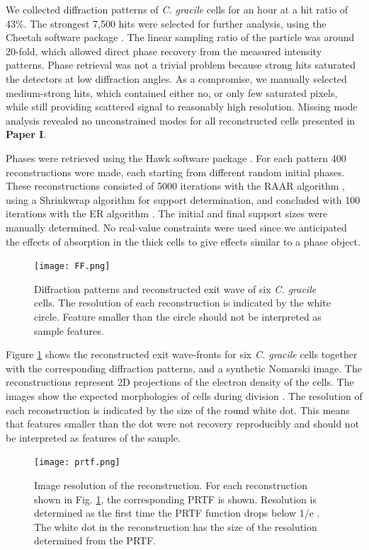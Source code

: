 We collected diffraction patterns of \textit{C. gracile} cells for an hour at a hit ratio of 43\%. The strongest 7,500 hits were selected for further analysis, using the Cheetah software package \cite{Barty2014}. The linear sampling ratio of the particle was around 20-fold, which allowed direct phase recovery from the measured intensity patterns. Phase retrieval was not a trivial problem because strong hits saturated the detectors at low diffraction angles. As a compromise, we manually selected medium-strong hits, which contained either no, or only few saturated pixels, while still providing scattered signal to reasonably high resolution. Missing mode analysis revealed no unconstrained modes for all reconstructed cells presented in \textbf{Paper I}. 

Phases were retrieved using the Hawk software package \cite{Maia2010}. For each pattern 400 reconstructions were made, each starting from different random initial phases. These reconstructions consisted of 5000 iterations with the RAAR algorithm \cite{Luke2005}, using a Shrinkwrap algorithm \cite{Marchesini2003} for support determination, and concluded with 100 iterations with the ER algorithm \cite{Fienup1978, Fienup1982}. The initial and final support sizes were manually determined. No real-value constraints were used since we anticipated the effects of absorption in the thick cells to give effects similar to a phase object. 

\begin{figure}[!ht]
	\centering 
		\texttt{[image: FF.png]}
	\caption{Diffraction patterns and reconstructed exit wave of six \textit{C. gracile} cells. The resolution of each reconstruction is indicated by the white circle. Feature smaller than the circle should not be interpreted as sample features.}
	\label{fig:Reconstructions}
\end{figure}

Figure \ref{fig:Reconstructions} shows the reconstructed exit wave-fronts for six \textit{C. gracile} cells together with the corresponding diffraction patterns, and a synthetic Nomarski image. The reconstructions represent 2D projections of the electron density of the cells. The images show the expected morphologies of cells during division \cite{Komarek1999,Bazire1988}. The resolution of each reconstruction is indicated by the size of the round white dot. This means that features smaller than the dot were not recovery reproducibly and should not be interpreted as features of the sample.

\begin{figure}[!ht]
	\centering 
		\texttt{[image: prtf.png]}
	\caption{Image resolution of the reconstruction. For each reconstruction shown in Fig. \ref{fig:Reconstructions}, the corresponding PRTF is shown. Resolution is determined as the first time the PRTF function drops below 1/e \cite{Seibert2011}. The white dot in the reconstruction has the size of the resolution determined from the PRTF.}
	\label{fig:PRTF}
\end{figure}

